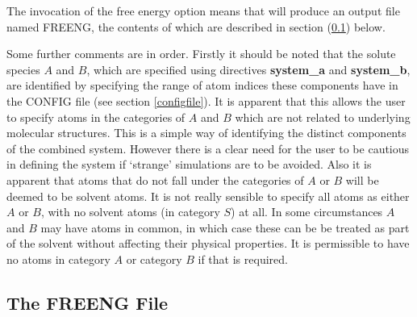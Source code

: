 The invocation of the free energy option means that \D{} will produce
an output file named FREENG, the contents of which are described in
section (\ref{freeng}) below.

Some further comments are in order. Firstly it should be noted that the solute
species $A$ and $B$, which are specified using directives {\bf system\_a} and
{\bf system\_b}, are identified by specifying the range of atom indices these
components have in the CONFIG file (see section \ref{configfile}). It is
apparent that this allows the user to specify atoms in the categories of $A$
and $B$ which are not related to underlying molecular structures. This is a
simple way of identifying the distinct components of the combined system.
However there is a clear need for the user to be cautious in defining the
system if `strange' simulations are to be avoided.  Also it is apparent that
atoms that do not fall under the categories of $A$ or $B$ will be deemed to be
solvent atoms. It is not really sensible to specify all atoms as either $A$ or
$B$, with no solvent atoms (in category $S$) at all. In some circumstances
$A$ and $B$ may have atoms in common, in which case these can be be treated as
part of the solvent without affecting their physical properties. It is
permissible to have no atoms in category $A$ or category $B$ if that is required.

\subsection{The FREENG File}
\label{freeng}

